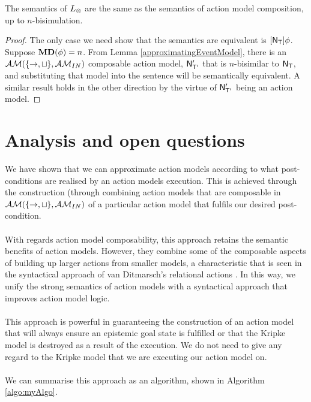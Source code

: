 \begin{lemma} \label{lemma:sameSemantics}
The semantics of $L_{\otimes}$ are the same as the semantics of action model composition, up to
$n$-bisimulation.
\end{lemma}
\begin{proof}
	The only case we need show that the semantics are equivalent is $[{\mathrm{\mathsf{N}}_\mathrm{\mathsf{T}}}] \phi$.
	Suppose ${\bf MD}(\phi) = n$.
	From Lemma \ref{approximatingEventModel}, there is an $\mathcal{AM}(\{\to,\sqcup\}, \mathcal{AM}_{IN})$ composable action model,
	$\mathrm{\mathsf{N}}'_{\mathrm{\mathsf{T}}'}$ that is $n$-bisimilar to $\mathrm{\mathsf{N}}_\mathrm{\mathsf{T}}$, and substituting that model into the
	sentence will be semantically equivalent.
	A similar result holds in the other direction by the virtue of $\mathrm{\mathsf{N}}'_{\mathrm{\mathsf{T}}'}$ being an action
	model.
\end{proof}

\section{Analysis and open questions} \label{subsec:multi:sequentCalc}

We have shown that we can approximate action models according to what
post-conditions are realised by an action models execution.
This is achieved through the construction (through combining action models that are composable in
$\mathcal{AM}(\{\to, \sqcup\}, \mathcal{AM}_{IN})$ of a particular action model that fulfils
our desired post-condition.\\
\\
With regards action model composability, this approach retains the semantic benefits of action models.
However, they combine some of the composable aspects of building up larger actions from smaller
models, a characteristic that is seen in the syntactical approach of van Ditmarsch's relational
actions \cite{ditmarsch99knowledge,ditmarsch2002dga}.
In this way, we unify the strong semantics of action models with a syntactical approach that
improves action model logic.\\
\\
This approach is powerful in guaranteeing the construction of an action model
that will always ensure an epistemic goal state is fulfilled or that the Kripke
model is destroyed as a result of the execution.
We do not need to give any regard to the Kripke model that we are executing our
action model on.\\
\\
We can summarise this approach as an algorithm, shown in Algorithm \ref{algo:myAlgo}.


